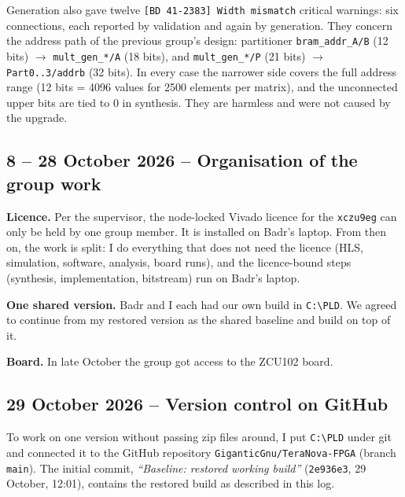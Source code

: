 \documentclass[11pt,a4paper]{article}
\newcommand{\code}[1]{\texttt{#1}}
\begin{document}
Generation also gave twelve \code{[BD 41-2383] Width mismatch} critical warnings: six connections, each reported by validation and again by generation. They concern the address path of the previous group's design: partitioner \code{bram\_addr\_A/B} (12 bits) $\rightarrow$ \code{mult\_gen\_*/A} (18 bits), and \code{mult\_gen\_*/P} (21 bits) $\rightarrow$ \code{Part0..3/addrb} (32 bits). In every case the narrower side covers the full address range (12 bits = 4096 values for 2500 elements per matrix), and the unconnected upper bits are tied to 0 in synthesis. They are harmless and were not caused by the upgrade.

\subsection{8 -- 28 October 2026 -- Organisation of the group work}
\textbf{Licence.} Per the supervisor, the node-locked Vivado licence for the \code{xczu9eg} can only be held by one group member. It is installed on Badr's laptop. From then on, the work is split: I do everything that does not need the licence (HLS, simulation, software, analysis, board runs), and the licence-bound steps (synthesis, implementation, bitstream) run on Badr's laptop.

\textbf{One shared version.} Badr and I each had our own build in \code{C:\textbackslash PLD}. We agreed to continue from my restored version as the shared baseline and build on top of it.

\textbf{Board.} In late October the group got access to the ZCU102 board.

\subsection{29 October 2026 -- Version control on GitHub}
To work on one version without passing zip files around, I put \code{C:\textbackslash PLD} under git and connected it to the GitHub repository \code{GiganticGnu/TeraNova-FPGA} (branch \code{main}). The initial commit, \emph{``Baseline: restored working build''} (\code{2e936e3}, 29 October, 12:01), contains the restored build as described in this log.
\end{document}
